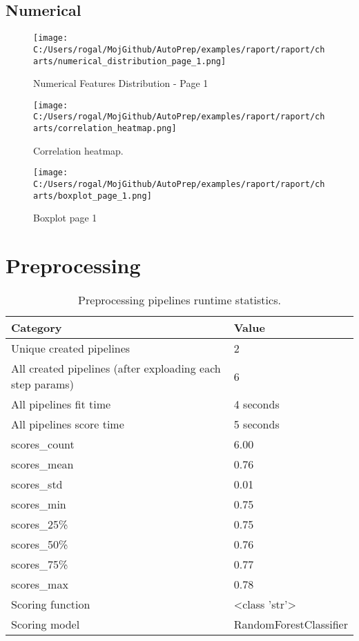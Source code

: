 \documentclass{article}%
\begin{document}
%
\subsection{Numerical}%
\label{subsec:Numerical}%

%


\begin{figure}[H]%
\centering%
\texttt{[image: C:/Users/rogal/MojGithub/AutoPrep/examples/raport/raport/charts/numerical\_distribution\_page\_1.png]}%
\caption{Numerical Features Distribution {-} Page 1}%
\end{figure}

%


\begin{figure}[H]%
\centering%
\texttt{[image: C:/Users/rogal/MojGithub/AutoPrep/examples/raport/raport/charts/correlation\_heatmap.png]}%
\caption{Correlation heatmap.}%
\end{figure}

%


\begin{figure}[H]%
\centering%
\texttt{[image: C:/Users/rogal/MojGithub/AutoPrep/examples/raport/raport/charts/boxplot\_page\_1.png]}%
\caption{Boxplot page 1}%
\end{figure}

%
\section{Preprocessing}%
\label{sec:Preprocessing}%

%


\begin{table}[H]%
\begin{center}%
\begin{tabular}{l l}%
\hline%
\textbf{Category}&\textbf{Value}\\%
\hline%
Unique created pipelines&2\\%
All created pipelines (after exploading each step params)&6\\%
All pipelines fit time&4 seconds\\%
All pipelines score time&5 seconds\\%
scores\_count&6.00\\%
scores\_mean&0.76\\%
scores\_std&0.01\\%
scores\_min&0.75\\%
scores\_25\%&0.75\\%
scores\_50\%&0.76\\%
scores\_75\%&0.77\\%
scores\_max&0.78\\%
Scoring function&<class 'str'>\\%
Scoring model&RandomForestClassifier\\%
\hline%
\end{tabular}%
\end{center}%
\caption{Preprocessing pipelines runtime statistics.}%
\end{table}
\end{document}
